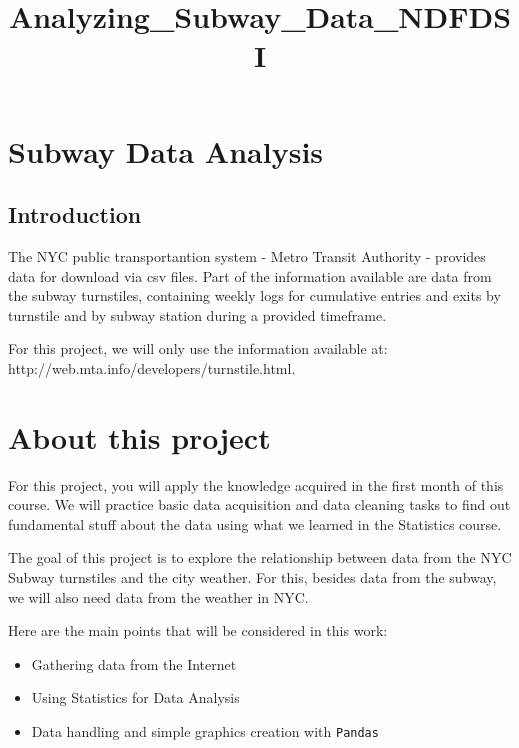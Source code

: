 \documentclass[11pt]{article}
\title{Analyzing\_Subway\_Data\_NDFDSI}
\providecommand{\tightlist}{%
      \setlength{\itemsep}{0pt}\setlength{\parskip}{0pt}}
\begin{document}
    
    
    \maketitle
    
    

    
    \section{Subway Data Analysis}\label{subway-data-analysis}

\subsection{Introduction}\label{introduction}

The NYC public transportantion system - Metro Transit Authority -
provides data for download via csv files. Part of the information
available are data from the subway turnstiles, containing weekly logs
for cumulative entries and exits by turnstile and by subway station
during a provided timeframe.

For this project, we will only use the information available at:
http://web.mta.info/developers/turnstile.html.

    \section{About this project}\label{about-this-project}

For this project, you will apply the knowledge acquired in the first
month of this course. We will practice basic data acquisition and data
cleaning tasks to find out fundamental stuff about the data using what
we learned in the Statistics course.

The goal of this project is to explore the relationship between data
from the NYC Subway turnstiles and the city weather. For this, besides
data from the subway, we will also need data from the weather in NYC.

Here are the main points that will be considered in this work:

\begin{itemize}
\tightlist
\item
  Gathering data from the Internet
\item
  Using Statistics for Data Analysis
\item
  Data handling and simple graphics creation with \texttt{Pandas}
\end{itemize}
\end{document}
